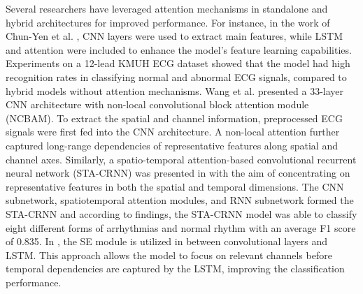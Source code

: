 \documentclass[preprint,12pt]{elsarticle}
\begin{document}
Several researchers have leveraged attention mechanisms in standalone and hybrid architectures for improved performance. For instance, in the work of Chun-Yen et al. \citep{chen_automated_2022}, CNN layers were used to extract main features, while LSTM and attention were included to enhance the model's feature learning capabilities. Experiments on a 12-lead KMUH ECG dataset showed that the model had high recognition rates in classifying normal and abnormal ECG signals, compared to hybrid models without attention mechanisms. Wang et al. \citep{wang_automated_2021} presented a 33-layer CNN architecture with non-local convolutional block attention module (NCBAM). To extract the spatial and channel information, preprocessed ECG signals were first fed into the CNN architecture. A non-local attention further captured long-range dependencies of representative features along spatial and channel axes. Similarly, a spatio-temporal attention-based convolutional recurrent neural network (STA-CRNN) was presented in \citep{zhang_ecg-based_2020} with the aim of concentrating on representative features in both the spatial and temporal dimensions. The CNN subnetwork, spatiotemporal attention modules, and RNN subnetwork formed the STA-CRNN and according to findings, the STA-CRNN model was able to classify eight different forms of arrhythmias and normal rhythm with an average F1 score of 0.835. In \citep{sun_arrhythmia_2024}, the SE module is utilized in between convolutional layers and LSTM. This approach allows the model to focus on relevant channels before temporal dependencies are captured by the LSTM, improving the classification performance.
\end{document}
